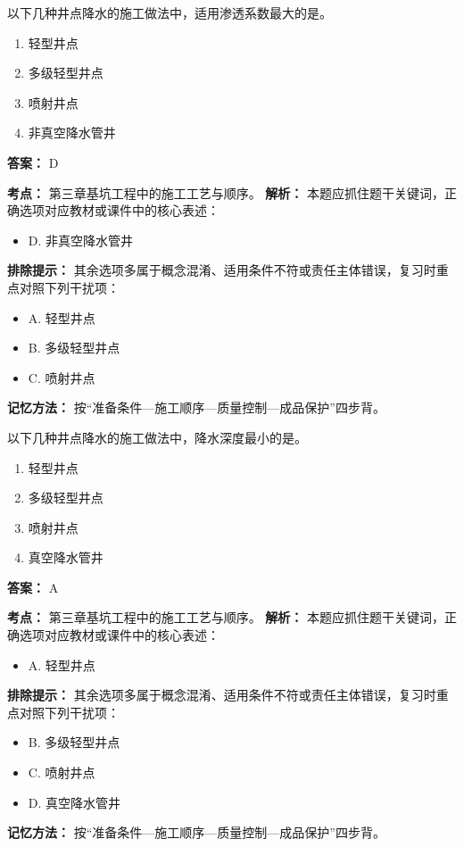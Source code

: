 \documentclass[UTF8,fontset=fandol,11pt]{ctexart}
\begin{document}
\vspace{0.2em}

\begin{quizbox}[title={第 16 题}]
以下几种井点降水的施工做法中，适用渗透系数最大的是。\\
\begin{enumerate}[label=\Alph*.]
\item 轻型井点
\item 多级轻型井点
\item 喷射井点
\item 非真空降水管井
\end{enumerate}
\textbf{答案：} D
\vspace{0.25em}
\begin{answerbox}[title={考点解析}]
\textbf{考点：} 第三章基坑工程中的施工工艺与顺序。
\textbf{解析：} 本题应抓住题干关键词，正确选项对应教材或课件中的核心表述：
\begin{itemize}
\item D. 非真空降水管井
\end{itemize}
\textbf{排除提示：} 其余选项多属于概念混淆、适用条件不符或责任主体错误，复习时重点对照下列干扰项：
\begin{itemize}
\item A. 轻型井点
\item B. 多级轻型井点
\item C. 喷射井点
\end{itemize}
\textbf{记忆方法：} 按“准备条件—施工顺序—质量控制—成品保护”四步背。
\end{answerbox}
\end{quizbox}

\vspace{0.2em}

\begin{quizbox}[title={第 17 题}]
以下几种井点降水的施工做法中，降水深度最小的是。\\
\begin{enumerate}[label=\Alph*.]
\item 轻型井点
\item 多级轻型井点
\item 喷射井点
\item 真空降水管井
\end{enumerate}
\textbf{答案：} A
\vspace{0.25em}
\begin{answerbox}[title={考点解析}]
\textbf{考点：} 第三章基坑工程中的施工工艺与顺序。
\textbf{解析：} 本题应抓住题干关键词，正确选项对应教材或课件中的核心表述：
\begin{itemize}
\item A. 轻型井点
\end{itemize}
\textbf{排除提示：} 其余选项多属于概念混淆、适用条件不符或责任主体错误，复习时重点对照下列干扰项：
\begin{itemize}
\item B. 多级轻型井点
\item C. 喷射井点
\item D. 真空降水管井
\end{itemize}
\textbf{记忆方法：} 按“准备条件—施工顺序—质量控制—成品保护”四步背。
\end{answerbox}
\end{quizbox}
\end{document}
